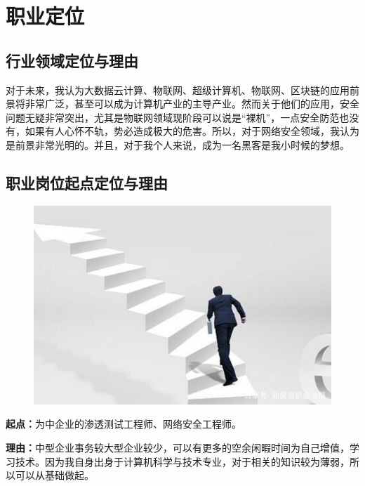 \documentclass{article}
\begin{document}



\section{职业定位}

\subsection{行业领域定位与理由}
	对于未来，我认为大数据云计算、物联网、超级计算机、物联网、区块链的应用前景将非常广泛，甚至可以成为计算机产业的主导产业。然而关于他们的应用，安全问题无疑非常突出，尤其是物联网领域现阶段可以说是“裸机”，一点安全防范也没有，如果有人心怀不轨，势必造成极大的危害。所以，对于网络安全领域，我认为是前景非常光明的。并且，对于我个人来说，成为一名黑客是我小时候的梦想。\par
\subsection{职业岗位起点定位与理由}
	\begin{figure}[h!]
	\centering
	\includegraphics[scale=0.6]{up.jpeg}
	\end{figure}
	\noindent\textbf{起点：}为中企业的渗透测试工程师、网络安全工程师。\par
	\noindent\textbf{理由：}中型企业事务较大型企业较少，可以有更多的空余闲暇时间为自己增值，学习技术。因为我自身出身于计算机科学与技术专业，对于相关的知识较为薄弱，所以可以从基础做起。
\end{document}
